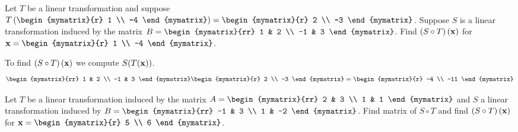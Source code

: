 \begin{enumialphparenastyle}
\begin{ex}
\begin{sol}
\end{sol}
\end{ex}


\begin{ex} Let $T$ be a linear transformation and suppose $T \tup{\begin{mymatrix}{r}
1 \\
-4 
\end{mymatrix} } = \begin{mymatrix}{r}
2 \\
-3 
\end{mymatrix}$. Suppose $S$ is a linear transformation induced by the matrix $B = \begin{mymatrix}{rr}
1 & 2 \\
-1 & 3
\end{mymatrix}$. Find $\left(S \circ T \right) \left({\bf x} \right)$ for $\vect{x} = \begin{mymatrix}{r}
1 \\
-4
\end{mymatrix}$. 
\begin{sol}
To find $\left(S \circ T \right) \left({\bf x} \right)$ we compute $S(T({\bf x}))$. 
\[
\begin{mymatrix}{rr}
1 & 2 \\
-1 & 3
\end{mymatrix}
\begin{mymatrix}{r}
2 \\
-3 
\end{mymatrix}
 = \begin{mymatrix}{r}
-4 \\
-11
\end{mymatrix}
\]
\end{sol}
\end{ex}


\begin{ex}  Let $T$ be a linear transformation induced by the matrix $A = \begin{mymatrix}{rr}
2 & 3 \\
1 & 1
\end{mymatrix}$ and $S$ a linear transformation induced by $B = \begin{mymatrix}{rr}
-1 & 3 \\
1 & -2 
\end{mymatrix}$. Find matrix of $S \circ T$ and find $\left(S \circ T \right) \left({\bf x} \right)$ for $\vect{x} = \begin{mymatrix}{r}
5 \\
6 
\end{mymatrix}$. 
\end{ex}



\end{enumialphparenastyle}
